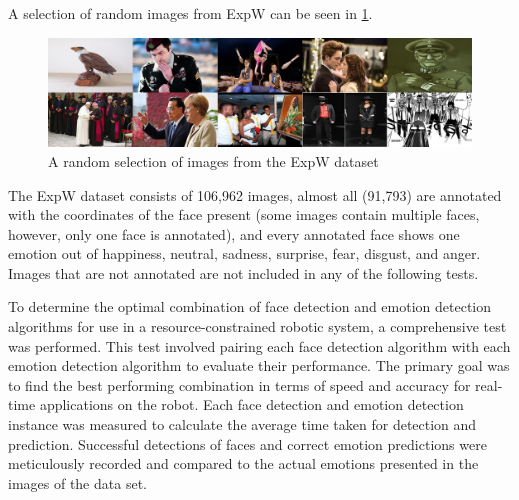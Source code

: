 A selection of random images from ExpW can be seen in \ref{figure:exp_w_sample}.

\begin{figure}[!htb]
    \centering{}
    \includegraphics[scale=0.18]{fed_images/exp_w_sample.jpg}
    \caption{A random selection of images from the ExpW dataset}
    \label{figure:exp_w_sample}
\end{figure}

The ExpW dataset consists of 106,962 images, almost all (91,793) are annotated with the coordinates of the face present (some images contain multiple faces, however, only one face is annotated), and every annotated face shows one emotion out of happiness, neutral, sadness, surprise, fear, disgust, and anger. Images that are not annotated are not included in any of the following tests.

To determine the optimal combination of face detection and emotion detection algorithms for use in a resource-constrained robotic system, a comprehensive test was performed. This test involved pairing each face detection algorithm with each emotion detection algorithm to evaluate their performance. The primary goal was to find the best performing combination in terms of speed and accuracy for real-time applications on the robot. Each face detection and emotion detection instance was measured to calculate the average time taken for detection and prediction. Successful detections of faces and correct emotion predictions were meticulously recorded and compared to the actual emotions presented in the images of the data set.

